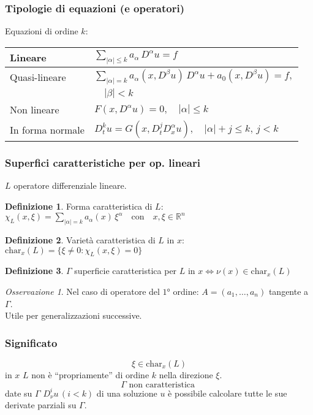 \documentclass[serif,notheorems]{beamer}
\theoremstyle{plain} %
\theoremstyle{definition} %
\newtheorem{definition}{Definizione}[section] %
\theoremstyle{remark}
\newtheorem*{remark}{Osservazione}
\begin{document}
\begin{frame}
\frametitle{Tipologie di equazioni (e operatori)}
Equazioni di ordine $k$:
\begin{table}
\renewcommand{\arraystretch}{2}
\begin{tabular}{l l} 
\hline \hline
 Lineare & $\sum_{|\alpha |\leq k} a_\alpha \, D^\alpha u = f$ \\
 \hline
 \vspace{-2mm}
 Quasi-lineare & $\sum_{|\alpha |= k} a_\alpha (x,D^\beta u) \, D^\alpha u +  a_0(x,D^\beta u)= f,$\\
 & $\quad |\beta |<k $ \\
 \hline
 Non lineare & $F(x,D^\alpha u)=0, \quad |\alpha | \leq k$ \\
 \hline
 In forma normale & $D_{t}^k u = G(x,D^j_t D^\alpha_x u), \quad |\alpha |+j \leq k, \, j < k$ \\
 \hline \hline
\end{tabular}
\end{table}
\end{frame}

\begin{frame}
\frametitle{Superfici caratteristiche per op. lineari}
$L$ operatore differenziale lineare.
\begin{definition}
Forma caratteristica di $L$:\\ $\chi_L(x,\xi)=\sum\limits_{|\alpha |= k} a_\alpha(x) \, \xi^\alpha \quad \text{con} \quad x,\xi \in \mathbb{R}^n$
\end{definition}

\begin{definition}
Varietà caratteristica di $L$ in $x$:\\ $\text{char}_x (L)= \{ \xi \neq 0 : \chi_L(x,\xi)=0 \}$
\end{definition}
\end{frame}

\begin{frame}
\begin{definition}
$\Gamma$ superficie caratteristica per $L$ in $x \iff \nu(x) \in\text{char}_x (L)$
\end{definition}
\begin{remark}
Nel caso di operatore del $1°$ ordine: $A=(a_1,\ldots ,a_n)$ tangente a $\Gamma$.\\
Utile per generalizzazioni successive.
\end{remark}
\end{frame}

\begin{frame}
\frametitle{Significato}
$$\xi \in \text{char}_x (L)$$
in $x$ $L$ non è ``propriamente'' di ordine $k$ nella direzione $\xi$.
\vspace{5mm}
$$\Gamma \text{ non caratteristica }$$ 
date su $\Gamma$ $D^i_\nu u \,(i<k)$ di una soluzione $u$
è possibile calcolare tutte le sue derivate parziali su $\Gamma$.
\end{frame}
\end{document}

